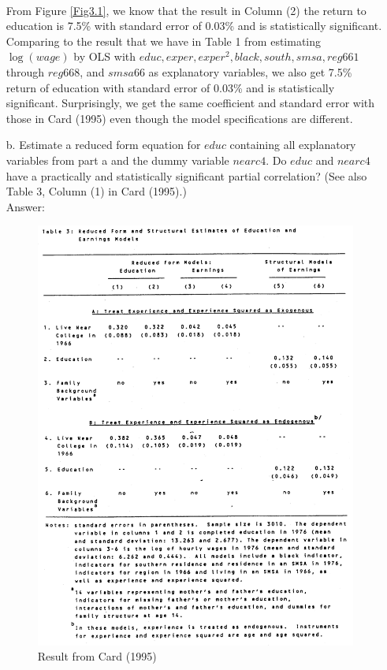 \documentclass[10pt]{article}
\begin{document}
\begin{enumerate}
\begin{figure}[h]
\end{figure}
\\
From Figure \ref{Fig3.1}, we know that the result in Column (2) the return to education is 7.5\% with standard error of 0.03\% and is statistically significant. Comparing to the result that we have in Table 1 from estimating $\log(wage)$ by OLS with $educ, exper, exper^2, black, south, smsa, reg661$ through $reg668$, and $smsa66$ as explanatory variables, we also get 7.5\% return of education with standard error of 0.03\% and is statistically significant. Surprisingly, we get the same coefficient and standard error with those in Card (1995) even though the model specifications are different.


\item[b.] Estimate a reduced form equation for $educ$ containing all explanatory variables from part a and the dummy variable $nearc4.$ Do $educ$ and $nearc4$ have a practically and statistically significant partial correlation? (See also Table 3, Column (1) in Card (1995).)
\\ Answer:
\begin{figure}[h]
    \caption{Result from Card (1995)} \label{Fig3.2}
    \centering
    \includegraphics[scale=0.23]{table3.png}

\end{figure}
\end{enumerate}
\end{document}
